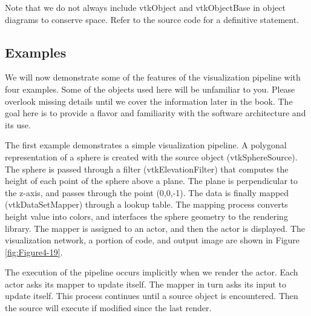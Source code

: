 Note that we do not always include vtkObject and vtkObjectBase in object diagrams to conserve space. Refer to the source code for a definitive statement.

\subsection{Examples}

We will now demonstrate some of the features of the visualization pipeline with four examples. Some of the objects used here will be unfamiliar to you. Please overlook missing details until we cover the information later in the book. The goal here is to provide a flavor and familiarity with the software architecture and its use.

\begin{description}[leftmargin=0cm,labelindent=0cm]

\item[Simple Sphere.] The first example demonstrates a simple visualization pipeline. A polygonal representation of a sphere is created with the source object (vtkSphereSource). The sphere is passed through a filter (vtkElevationFilter) that computes the height of each point of the sphere above a plane. The plane is perpendicular to the z-axis, and passes through the point (0,0,-1). The data is finally mapped (vtkDataSetMapper) through a lookup table. The mapping process converts height value into colors, and interfaces the sphere geometry to the rendering library. The mapper is assigned to an actor, and then the actor is displayed. The visualization network, a portion of code, and output image are shown in Figure \ref{fig:Figure4-19}.

The execution of the pipeline occurs implicitly when we render the actor. Each actor asks its mapper to update itself. The mapper in turn asks its input to update itself. This process continues until a source object is encountered. Then the source will execute if modified since the last render.


\end{description}
